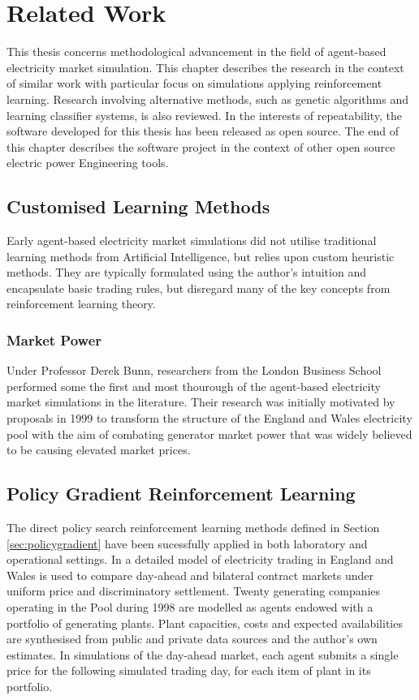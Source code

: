 \chapter{Related Work}
\label{ch:related_work}
This thesis concerns methodological advancement in the field of agent-based
electricity market simulation.  This chapter describes the research in the
context of similar work with particular focus on simulations applying
reinforcement learning.  Research involving alternative methods, such as
genetic algorithms and learning classifier systems, is also reviewed.  In the
interests of repeatability, the software developed for this thesis has been
released as open source.  The end of this chapter describes the software
project in the context of other open source electric power Engineering tools.

\section{Customised Learning Methods}
Early agent-based electricity market simulations did not utilise traditional
learning methods from Artificial Intelligence, but relies upon custom
heuristic methods.  They are typically formulated using the author's intuition
and encapsulate basic trading rules, but disregard many of the key concepts
from reinforcement learning theory.

\subsection{Market Power}
Under Professor Derek Bunn, researchers from the London Business School
performed some the first and most thourough of the agent-based electricity
market simulations in the literature.  Their research was initially motivated
by proposals in 1999 to transform the structure of the England and Wales
electricity pool with the aim of combating generator market power that was
widely believed to be causing elevated market prices.

\section{Policy Gradient Reinforcement Learning}
The direct policy search reinforcement learning methods defined in Section
\ref{sec:policygradient} have been sucessfully applied in both laboratory and
operational settings.  In \cite{bower:2001} a detailed model of electricity
trading in England and Wales is used to compare day-ahead and bilateral
contract markets under uniform price and discriminatory settlement.  Twenty
generating companies operating in the Pool during 1998 are modelled as agents
endowed with a portfolio of generating plants.  Plant capacities, costs and
expected availabilities are synthesised from public and private data sources
and the author's own estimates.  In simulations of the day-ahead market, each
agent submits a single price for the following simulated trading day, for each
item of plant in its portfolio.

